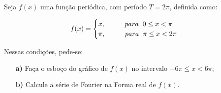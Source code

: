 \linespread{1.5}
Seja $f(x)$ uma função periódica, com período $T = 2\pi$, definida como:

\begin{equation*}
    f(x) = \begin{cases}
    x, \hspace{1cm} para \hspace{0.2cm} 0 \leq x < \pi\\
    \pi, \hspace{1cm} para \hspace{0.2cm} \pi \leq x < 2\pi
    \end{cases}\,
\end{equation*}

Nessas condições, pede-se:
\begin{itemize}
    \item[\textbf{a)}] Faça o esboço do gráfico de $f(x)$ no intervalo $-6\pi \leq x < 6\pi$;
    \item[\textbf{b)}]Calcule a série de Fourier na Forma real de $f(x)$.
\end{itemize}